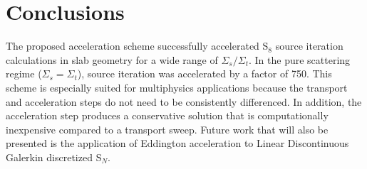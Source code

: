 \documentclass{anstrans}
\newcommand{\SN}{S$_N$\xspace}
\begin{document}

\section{Conclusions}
	The proposed acceleration scheme successfully accelerated S$_8$ source iteration calculations in slab geometry for a wide range of $\Sigma_s/\Sigma_t$. In the pure scattering regime ($\Sigma_s = \Sigma_t$), source iteration was accelerated by a factor of 750. This scheme is especially suited for multiphysics applications because the transport and acceleration steps do not need to be consistently differenced. In addition, the acceleration step produces a conservative solution that is computationally inexpensive compared to a transport sweep. Future work that will also be presented is the application of Eddington acceleration to Linear Discontinuous Galerkin discretized \SN. 




\end{document}
